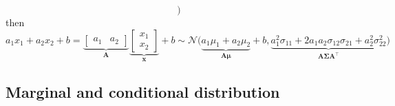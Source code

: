 \documentclass[12pt,a4paper]{article}
\begin{document}
\begin{itemize}
\begin{itemize}
\begin{equation}
      \bigg)
    \end{equation}
    then
    \begin{equation}\nonumber%
      a_{1}x_{1} + a_{2}x_{2} + b
      =
      \underbrace{
      \begin{bmatrix}
        a_{1} & a_{2}
      \end{bmatrix}}_{\bm{A}}
      \underbrace{
      \begin{bmatrix}
        x_{1} \\ x_{2}
      \end{bmatrix}}_{\bm{x}}
    + b
      \sim
      \mathcal{N}
      \big(
      \underbrace{a_{1}\mu_{1}+a_{2}\mu_{2}}_{\bm{A}\bm{\mu}} + b,
      \underbrace{
        a_{1}^{2}\sigma_{11} + 2a_{1}a_{2}\sigma_{12}\sigma_{21} + a_{2}^{2}\sigma_{22}^{2}
        }_{\bm{A}\bm{\Sigma}\bm{A}^{\top}}
      \big)
    \end{equation}
  \end{itemize}

\end{itemize}

\subsection{Marginal and conditional distribution}
\end{document}
